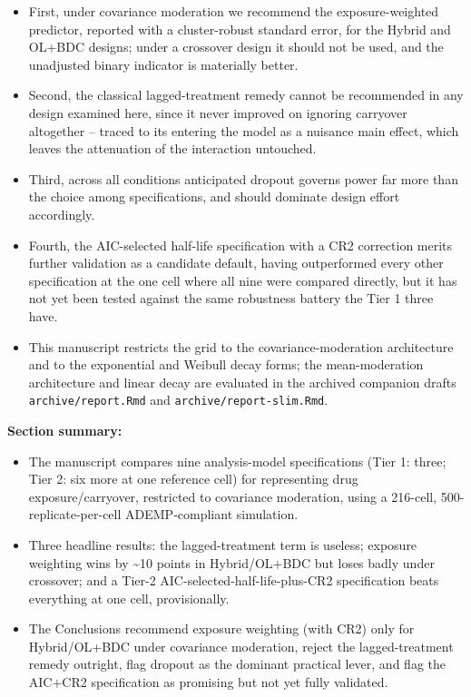 \documentclass[
  11pt,
]{article}
\providecommand{\tightlist}{%
  \setlength{\itemsep}{0pt}\setlength{\parskip}{0pt}}
\begin{document}
\begin{itemize}
\tightlist
\item
  First, under covariance moderation we recommend the
  exposure-weighted predictor, reported with a cluster-robust
  standard error, for the Hybrid and OL+BDC designs; under a
  crossover design it should not be used, and the unadjusted binary
  indicator is materially better.
\item
  Second, the classical lagged-treatment remedy cannot be recommended
  in any design examined here, since it never improved on ignoring
  carryover altogether -- traced to its entering the model as a
  nuisance main effect, which leaves the attenuation of the
  interaction untouched.
\item
  Third, across all conditions anticipated dropout governs power far
  more than the choice among specifications, and should dominate
  design effort accordingly.
\item
  Fourth, the AIC-selected half-life specification with a CR2
  correction merits further validation as a candidate default,
  having outperformed every other specification at the one cell where
  all nine were compared directly, but it has not yet been tested
  against the same robustness battery the Tier 1 three have.
\item
  This manuscript restricts the grid to the covariance-moderation
  architecture and to the exponential and Weibull decay forms; the
  mean-moderation architecture and linear decay are evaluated in the
  archived companion drafts \texttt{archive/report.Rmd} and
  \texttt{archive/report-slim.Rmd}.
\end{itemize}

\textbf{Section summary:}

\begin{itemize}
\tightlist
\item
  The manuscript compares nine analysis-model specifications (Tier 1:
  three; Tier 2: six more at one reference cell) for representing
  drug exposure/carryover, restricted to covariance moderation, using
  a 216-cell, 500-replicate-per-cell ADEMP-compliant simulation.
\item
  Three headline results: the lagged-treatment term is useless;
  exposure weighting wins by \textasciitilde10 points in Hybrid/OL+BDC but loses
  badly under crossover; and a Tier-2 AIC-selected-half-life-plus-CR2
  specification beats everything at one cell, provisionally.
\item
  The Conclusions recommend exposure weighting (with CR2) only for
  Hybrid/OL+BDC under covariance moderation, reject the
  lagged-treatment remedy outright, flag dropout as the dominant
  practical lever, and flag the AIC+CR2 specification as promising
  but not yet fully validated.
\end{itemize}
\end{document}
